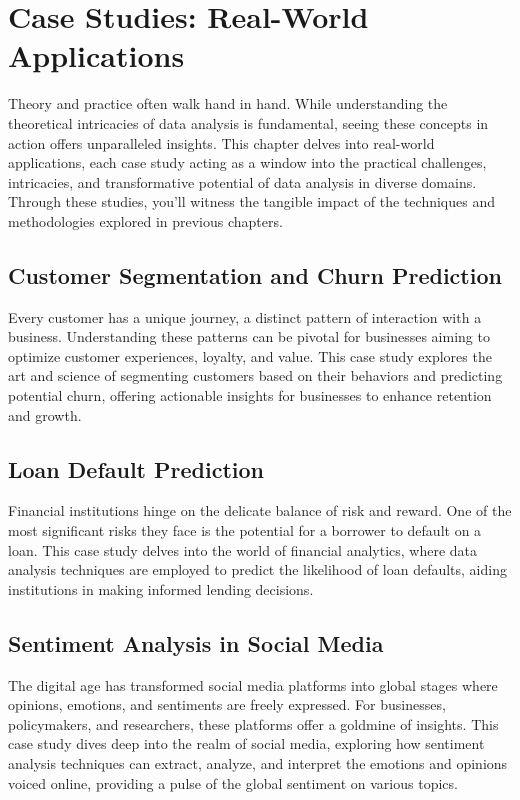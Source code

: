 \documentclass[a4paper,12pt]{book}
\begin{document}
\chapter{Case Studies: Real-World Applications}
Theory and practice often walk hand in hand. While understanding the theoretical intricacies of data analysis is fundamental, seeing these concepts in action offers unparalleled insights. This chapter delves into real-world applications, each case study acting as a window into the practical challenges, intricacies, and transformative potential of data analysis in diverse domains. Through these studies, you'll witness the tangible impact of the techniques and methodologies explored in previous chapters.

\section{Customer Segmentation and Churn Prediction}
Every customer has a unique journey, a distinct pattern of interaction with a business. Understanding these patterns can be pivotal for businesses aiming to optimize customer experiences, loyalty, and value. This case study explores the art and science of segmenting customers based on their behaviors and predicting potential churn, offering actionable insights for businesses to enhance retention and growth.

\section{Loan Default Prediction}
Financial institutions hinge on the delicate balance of risk and reward. One of the most significant risks they face is the potential for a borrower to default on a loan. This case study delves into the world of financial analytics, where data analysis techniques are employed to predict the likelihood of loan defaults, aiding institutions in making informed lending decisions.

\section{Sentiment Analysis in Social Media}
The digital age has transformed social media platforms into global stages where opinions, emotions, and sentiments are freely expressed. For businesses, policymakers, and researchers, these platforms offer a goldmine of insights. This case study dives deep into the realm of social media, exploring how sentiment analysis techniques can extract, analyze, and interpret the emotions and opinions voiced online, providing a pulse of the global sentiment on various topics.
\end{document}
